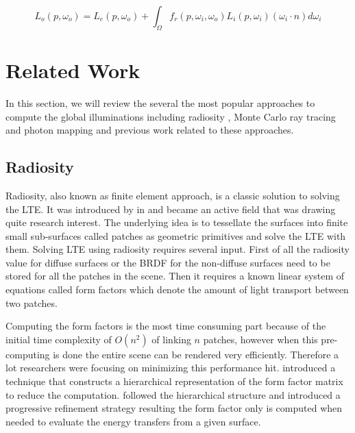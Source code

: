 \begin{equation}
L_{o}(p, \omega_{o}) = L_{e}(p, \omega_{o}) + \int_{\Omega}f_{r}(p, \omega_{i}, \omega_{o})L_{i}(p, \omega_{i})(\omega_{i} \cdot n)d\omega_{i}
\label{eq:lte}
\end{equation}  


\section{Related Work}
In this section, we will review the several the most popular approaches to compute the global illuminations including radiosity , Monte Carlo ray tracing and photon mapping and previous work related to these approaches. 


\subsection{Radiosity}

Radiosity, also known as finite element approach, is a classic solution to solving the LTE. It was introduced by  \citeauthor{Goral:1984:MIL:964965.808601} in \citep{Goral:1984:MIL:964965.808601} and became an active field that was drawing quite research interest. The underlying idea is to tessellate the surfaces into finite small sub-surfaces called patches as geometric primitives and solve the LTE with them. Solving LTE using radiosity requires several input. First of all the radiosity value for diffuse surfaces or the BRDF for the non-diffuse surfaces need to be stored for all the patches in the scene. Then it requires a known linear system of equations called form factors which denote the amount of light transport between two patches. 

Computing the form factors is the most time consuming part because of the initial time complexity of \(O(n^{2})\) of linking \(n\) patches, however when this pre-computing is done the entire scene can be rendered very efficiently. Therefore a lot researchers were focusing on minimizing this performance hit. \citeauthor{Hanrahan:1991:RHR:127719.122740}\cite{Hanrahan:1991:RHR:127719.122740} introduced a technique that constructs a hierarchical representation of the form factor matrix to reduce the computation. \citeauthor{Holzschuch94anefficient}\cite{Holzschuch94anefficient} followed the hierarchical structure and introduced a progressive refinement strategy resulting the form factor only is computed when needed to evaluate the energy transfers from a given surface. 



